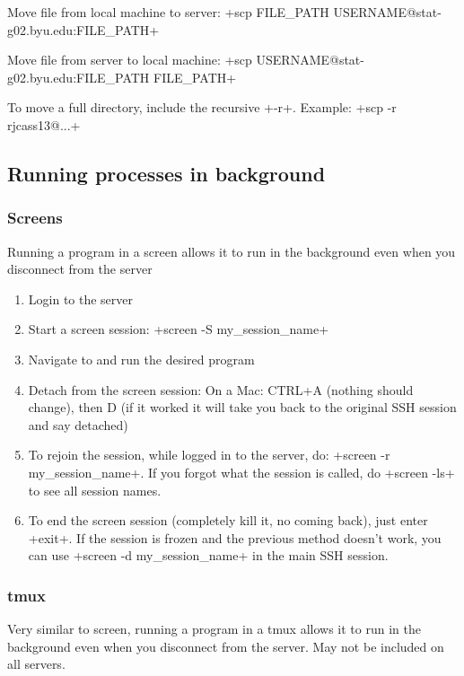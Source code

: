 \documentclass{article}
\let\verb\relax
\newcommand{\verb}{\collectverb{\color{codefg}\ttfamily\colorbox{codebg}}}
\begin{document}
Move file from local machine to server: \verb+scp FILE_PATH USERNAME@stat-g02.byu.edu:FILE_PATH+

Move file from server to local machine: \verb+scp USERNAME@stat-g02.byu.edu:FILE_PATH FILE_PATH+

To move a full directory, include the recursive \verb+-r+. Example: \verb+scp -r rjcass13@...+

\subsection{Running processes in background}

\subsubsection{Screens}

Running a program in a screen allows it to run in the background even when you disconnect from the server

\begin{enumerate}
    \item Login to the server
    \item Start a screen session: \verb+screen -S my_session_name+
    \item Navigate to and run the desired program
    \item Detach from the screen session: On a Mac: CTRL+A (nothing should change), then D (if it worked it will take you back to the original SSH session and say detached)
    \item To rejoin the session, while logged in to the server, do: \verb+screen -r my_session_name+. If you forgot what the session is called, do \verb+screen -ls+ to see all session names. 
    \item To end the screen session (completely kill it, no coming back), just enter \verb+exit+. If the session is frozen and the previous method doesn't work, you can use \verb+screen -d my_session_name+ in the main SSH session.
\end{enumerate}


\subsubsection{tmux}

Very similar to screen, running a program in a tmux allows it to run in the background even when you disconnect from the server. May not be included on all servers. 
\end{document}
